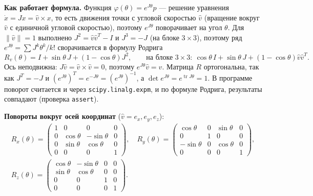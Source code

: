\documentclass[a4paper, 12pt]{article}
\DeclareMathOperator{\tr}{tr}
\newcommand{\hv}{\hat v}
\begin{document}
    \textbf{Как работает формула.} Функция $\varphi(\theta)=e^{J\theta}p$ --- решение уравнения $\dot x=Jx=\hv\times x$, то есть движения точки с угловой скоростью $\hv$ (вращение вокруг $\hv$ с единичной угловой скоростью), поэтому $e^{J\theta}$ поворачивает на угол $\theta$. Для $\|\hv\|=1$ выполнено $J^2=\hv\hv^T-I$ и $J^3=-J$ (на блоке $3\times3$), поэтому ряд $e^{J\theta}=\sum J^k\theta^k/k!$ сворачивается в формулу Родрига
    $$R_v(\theta)=I+\sin\theta\,J+(1-\cos\theta)J^2,\qquad\text{на блоке }3\times3:\ \cos\theta\,I+\sin\theta\,J+(1-\cos\theta)\hv\hv^T.$$
    Ось неподвижна: $J\hv=\hv\times\hv=0$, поэтому $e^{J\theta}\hv=\hv$. Матрица $R$ ортогональна, так как $J^T=-J$ и $(e^{J\theta})^T=e^{-J\theta}=(e^{J\theta})^{-1}$, а $\det e^{J\theta}=e^{\tr J\theta}=1$. В программе поворот считается и через \texttt{scipy.linalg.expm}, и по формуле Родрига, результаты совпадают (проверка \texttt{assert}).

    \textbf{Повороты вокруг осей координат} ($\hv=e_x,e_y,e_z$):
    \begin{gather*}
    R_x(\theta)=\begin{pmatrix}1&0&0&0\\0&\cos\theta&-\sin\theta&0\\0&\sin\theta&\cos\theta&0\\0&0&0&1\end{pmatrix},\quad
    R_y(\theta)=\begin{pmatrix}\cos\theta&0&\sin\theta&0\\0&1&0&0\\-\sin\theta&0&\cos\theta&0\\0&0&0&1\end{pmatrix},\\
    R_z(\theta)=\begin{pmatrix}\cos\theta&-\sin\theta&0&0\\\sin\theta&\cos\theta&0&0\\0&0&1&0\\0&0&0&1\end{pmatrix}.
    \end{gather*}
\end{document}
